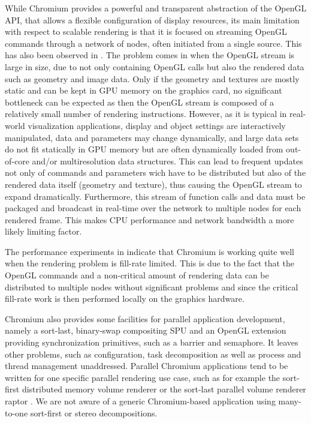While Chromium \cite{HHNFAKK:02} provides a powerful and transparent abstraction
of the OpenGL API, that allows a flexible configuration of display resources,
its main limitation with respect to scalable rendering is that it is focused on
streaming OpenGL commands through a network of nodes, often initiated from a
single source. This has also been observed in \cite{SWNH:03}. The problem comes
in when the OpenGL stream is large in size, due to not only containing OpenGL
calls but also the rendered data such as geometry and image data. Only if the
geometry and textures are mostly static and can be kept in GPU memory on the
graphics card, no significant bottleneck can be expected as then the OpenGL
stream is composed of a relatively small number of rendering instructions.
However, as it is typical in real-world visualization applications, display and
object settings are interactively manipulated, data and parameters may change
dynamically, and large data sets do not fit statically in GPU memory but are
often dynamically loaded from out-of-core and/or multiresolution data
structures. This can lead to frequent updates not only of commands and
parameters wich have to be distributed but also of the rendered data itself
(geometry and texture), thus causing the OpenGL stream to expand dramatically.
Furthermore, this stream of function calls and data must be packaged and
broadcast in real-time over the network to multiple nodes for each rendered
frame. This makes CPU performance and network bandwidth a more likely limiting
factor.

The performance experiments in \cite{HHNFAKK:02} indicate that Chromium is
working quite well when the rendering problem is fill-rate limited. This is due
to the fact that the OpenGL commands and a non-critical amount of rendering data
can be distributed to multiple nodes without significant problems and since the
critical fill-rate work is then performed locally on the graphics hardware.

Chromium also provides some facilities for parallel application development,
namely a sort-last, binary-swap compositing SPU and an OpenGL extension
providing synchronization primitives, such as a barrier and semaphore. It leaves
other problems, such as configuration, task decomposition as well as process and
thread management unaddressed. Parallel Chromium applications tend to be written
for one specific parallel rendering use case, such as for example the sort-first
distributed memory volume renderer \cite{BHPB:03} or the sort-last parallel
volume renderer raptor \cite{Raptor}. We are not aware of a generic
Chromium-based application using many-to-one sort-first or stereo
decompositions.


